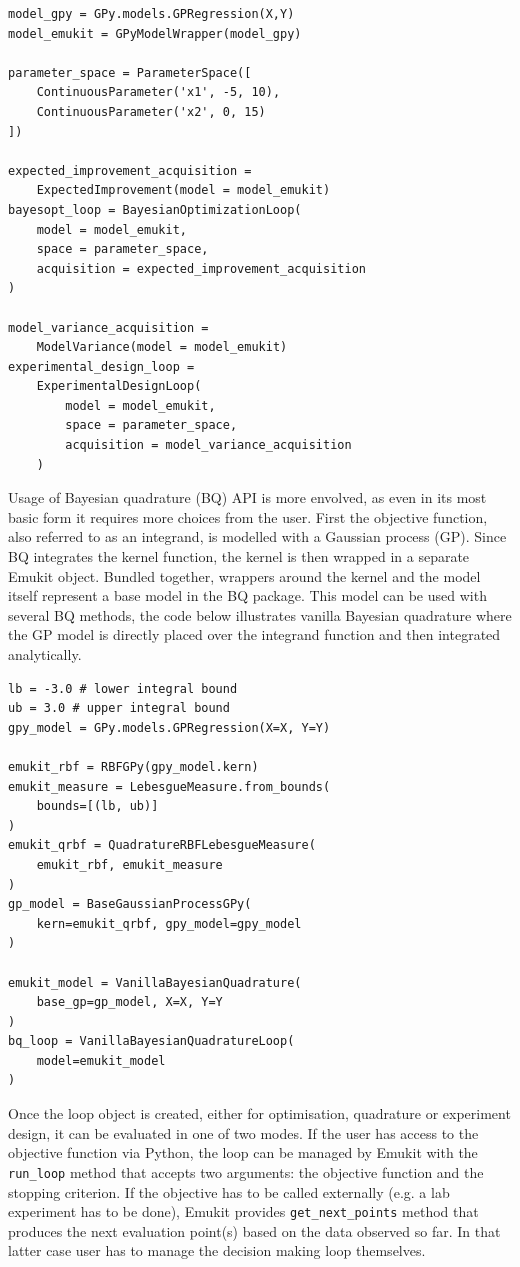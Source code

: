 \begin{verbatim}
model_gpy = GPy.models.GPRegression(X,Y)
model_emukit = GPyModelWrapper(model_gpy)

parameter_space = ParameterSpace([
    ContinuousParameter('x1', -5, 10),
    ContinuousParameter('x2', 0, 15)
])

expected_improvement_acquisition =
    ExpectedImprovement(model = model_emukit)
bayesopt_loop = BayesianOptimizationLoop(
    model = model_emukit,
    space = parameter_space,
    acquisition = expected_improvement_acquisition
)

model_variance_acquisition =
    ModelVariance(model = model_emukit)
experimental_design_loop =
    ExperimentalDesignLoop(
        model = model_emukit,
        space = parameter_space,
        acquisition = model_variance_acquisition
    )
\end{verbatim}

Usage of Bayesian quadrature (BQ) API is more envolved, as even in its most basic form it requires more choices from the user. First the objective function, also referred to as an integrand, is modelled with a Gaussian process (GP). Since BQ integrates the kernel function, the kernel is then wrapped in a separate Emukit object. Bundled together, wrappers around the kernel and the model itself represent a base model in the BQ package. This model can be used with several BQ methods, the code below illustrates vanilla Bayesian quadrature where the GP model is directly placed over the integrand function and then integrated analytically.

\begin{verbatim}
lb = -3.0 # lower integral bound
ub = 3.0 # upper integral bound
gpy_model = GPy.models.GPRegression(X=X, Y=Y)

emukit_rbf = RBFGPy(gpy_model.kern)
emukit_measure = LebesgueMeasure.from_bounds(
    bounds=[(lb, ub)]
)
emukit_qrbf = QuadratureRBFLebesgueMeasure(
    emukit_rbf, emukit_measure
)
gp_model = BaseGaussianProcessGPy(
    kern=emukit_qrbf, gpy_model=gpy_model
)

emukit_model = VanillaBayesianQuadrature(
    base_gp=gp_model, X=X, Y=Y
)
bq_loop = VanillaBayesianQuadratureLoop(
    model=emukit_model
)
\end{verbatim}

Once the loop object is created, either for optimisation, quadrature or experiment design, it can be evaluated in one of two modes. If the user has access to the objective function via Python, the loop can be managed by Emukit with the \texttt{run\_loop} method that accepts two arguments: the objective function and the stopping criterion. If the objective has to be called externally (e.g. a lab experiment has to be done), Emukit provides \texttt{get\_next\_points} method that produces the next evaluation point(s) based on the data observed so far. In that latter case user has to manage the decision making loop themselves.

